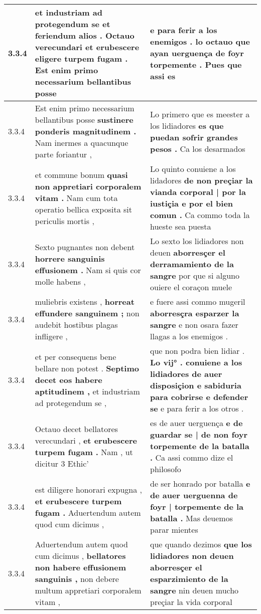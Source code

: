 \begin{tabular}{|p{1cm}|p{6.5cm}|p{6.5cm}|}
3.3.4 & et industriam ad protegendum se et feriendum alios . \textbf{ Octauo verecundari et erubescere eligere turpem fugam . } Est enim primo necessarium bellantibus posse & e para ferir a los enemigos . \textbf{ lo octauo que ayan uerguença de foyr torpemente . } Pues que assi es \\\hline
3.3.4 & Est enim primo necessarium bellantibus posse \textbf{ sustinere ponderis magnitudinem . } Nam inermes a quacunque parte foriantur , & Lo primero que es meester a los lidiadores \textbf{ es que puedan sofrir grandes pesos . } Ca los desarmados \\\hline
3.3.4 & et commune bonum \textbf{ quasi non appretiari corporalem vitam . } Nam cum tota operatio bellica exposita sit periculis mortis , & Lo quinto conuiene a los lidadores \textbf{ de non preçiar la vianda corporal | por la iustiçia e por el bien comun . } Ca commo toda la hueste sea puesta \\\hline
3.3.4 & Sexto pugnantes non debent \textbf{ horrere sanguinis effusionem . } Nam si quis cor molle habens , & Lo sexto los lidiadores non deuen \textbf{ aborresçer el derramamiento de la sangre } por que si alguno ouiere el coraçon muele \\\hline
3.3.4 & muliebris existens , \textbf{ horreat effundere sanguinem ; } non audebit hostibus plagas infligere , & e fuere assi commo mugeril \textbf{ aborresçra esparzer la sangre } e non osara fazer llagas a los enemigos . \\\hline
3.3.4 & et per consequens bene bellare non potest . \textbf{ Septimo decet eos habere aptitudinem , } et industriam ad protegendum se , & que non podra bien lidiar . \textbf{ Lo vij° . conuiene a los lidiadores de auer disposiçion e sabiduria para cobrirse e defender se } e para ferir a los otros . \\\hline
3.3.4 & Octauo decet bellatores verecundari , \textbf{ et erubescere turpem fugam . } Nam , ut dicitur 3 Ethic’ & es de auer uerguença \textbf{ e de guardar se | de non foyr torpemente de la batalla . } Ca assi commo dize el philosofo \\\hline
3.3.4 & est diligere honorari expugna , \textbf{ et erubescere turpem fugam . } Aduertendum autem quod cum dicimus , & de ser honrado por batalla \textbf{ e de auer uerguenna de foyr | torpemente de la batalla . } Mas deuemos parar mientes \\\hline
3.3.4 & Aduertendum autem quod cum dicimus , \textbf{ bellatores non habere effusionem sanguinis , } non debere multum appretiari corporalem vitam , & que quando dezimos \textbf{ que los lidiadores non deuen aborresçer el esparzimiento de la sangre } nin deuen mucho preçiar la vida corporal \\\hline

\end{tabular}
